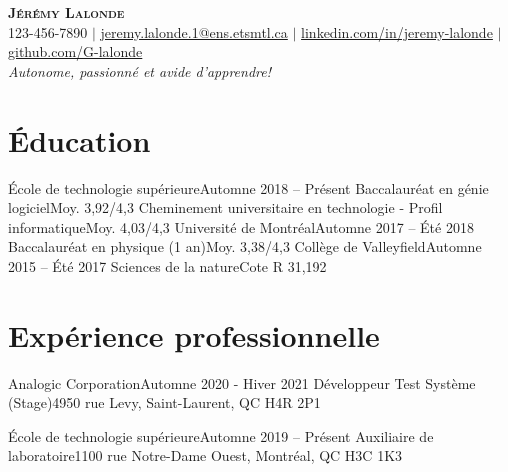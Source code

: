 \documentclass[letterpaper,11pt]{article}
\begin{document}
\begin{center}
  \textbf{\Huge \scshape J\'er\'emy Lalonde} \\ \vspace{1pt}
  \small 123-456-7890 $|$ \href{mailto:jeremy.lalonde.1@ens.etsmtl.ca}{jeremy.lalonde.1@ens.etsmtl.ca} $|$ 
  \href{https://linkedin.com/in/jeremy-lalonde}{linkedin.com/in/jeremy-lalonde} $|$
  \href{https://github.com/G-lalonde}{github.com/G-lalonde} \\
  \textit{\small {Autonome, passionn\'e et avide d'apprendre!}}
\end{center}

\section{\'Education}
  \resumeSubHeadingListStart
    \resumeSubheadingTwo 
      {\'Ecole de technologie sup\'erieure}{Automne 2018 -- Pr\'esent}
      {Baccalaur\'eat en g\'enie logiciel}{Moy. 3,92/4,3}
      {Cheminement universitaire en technologie - Profil informatique}{Moy. 4,03/4,3}
    \resumeSubheading
      {Universit\'e de Montr\'eal}{Automne 2017 -- \'Et\'e 2018}
      {Baccalaur\'eat en physique (1 an)}{Moy. 3,38/4,3}
    \resumeSubheading
      {Coll\`ege de Valleyfield}{Automne 2015 -- \'Et\'e 2017}
      {Sciences de la nature}{Cote R 31,192}
  \resumeSubHeadingListEnd

\section{Exp\'erience professionnelle}
  \resumeSubHeadingListStart

    \resumeSubheading
      {Analogic Corporation}{Automne 2020 - Hiver 2021}
      {D\'eveloppeur Test Syst\`eme (Stage)}{4950 rue Levy, Saint-Laurent, QC H4R 2P1}
      \resumeItemListStart
      \resumeItemListEnd

    \resumeSubheading
      {\'Ecole de technologie sup\'erieure}{Automne 2019 -- Pr\'esent}
      {Auxiliaire de laboratoire}{1100 rue Notre-Dame Ouest, Montr\'eal, QC H3C 1K3}
      \resumeItemListStart
      \resumeItemListEnd
    
\end{document}

